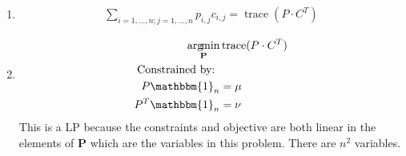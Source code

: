 \documentclass[11pt]{article}
\DeclareMathOperator*{\argmin}{arg\!min}
\DeclareMathOperator*{\trace}{trace}
\begin{document}
\begin{solution}
\begin{enumerate}
\item
    \begin{align*}
    \sum_{i=1,\dots,n ; j=1,\dots,n} p_{i,j} c_{i,j} = \trace(P \cdot C^T)
    \end{align*}

\item
    \begin{align*}
        \argmin_{\mathbf{P}} &\trace(P \cdot C^T) \\
        \text{Constrained by: }& \\
        P \mathbbm{1}_n &= \mu \\
        P^T \mathbbm{1}_n &= \nu
    \end{align*}
    This is a LP because the constraints and objective are both linear in the elements of $\mathbf{P}$ which are the variables in this problem. There are $n^2$ variables.


\end{enumerate}
\end{solution}
\end{document}
